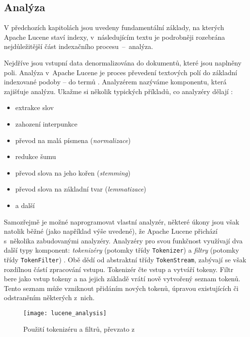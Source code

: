 \documentclass[11pt,oneside]{fithesis2}
\begin{document}
\subsection{Analýza}
V předchozích kapitolách jsou uvedeny fundamentální základy, na kterých Apache Lucene staví indexy, v~následujícím textu je podrobněji rozebrána nejdůležitější část indexačního procesu~--~analýza.

Nejdříve jsou vstupní data denormalizována do dokumentů, které jsou naplněny poli. Analýza v~Apache Lucene je proces převedení textových polí do základní indexované podoby -- do termů \cite[s.~28]{LuceneAction}. Analyzérem nazýváme komponentu, která zajišťuje analýzu. Ukažme si několik typických příkladů, co analyzéry dělají  \cite[s.~110]{LuceneAction}:

\begin{itemize}
	\item extrakce slov
	\item zahození interpunkce
	\item převod na malá písmena (\emph{normalizace})
	\item redukce šumu
	\item převod slova na jeho kořen (\emph{stemming})
	\item převod slova na základní tvar (\emph{lemmatizace})
	\item a další 
\end{itemize}

Samozřejmě je možné naprogramovat vlastní analyzér, některé úkony jsou však natolik běžné (jako například výše uvedené), že Apache Lucene přichází s~několika zabudovanými analyzéry. Analyzéry pro svou funkčnost využívají dva další typy komponent: \emph{tokenizéry} (potomky třídy \texttt{Tokenizer}) a \emph{filtry} (potomky třídy \texttt{TokenFilter})  \cite[s.~115]{LuceneAction}. Obě dědí od abstraktní třídy \texttt{TokenStream}, zabývají se však rozdílnou částí zpracování vstupu. Tokenizér čte vstup a vytváří tokeny. Filtr bere jako vstup tokeny a na jejich základě vrátí nově vytvořený seznam tokenů. Tento seznam může vzniknout přidáním nových tokenů, úpravou existujících či odstraněním některých z~nich. 

\begin{figure}[hb]
	\begin{center}
		\texttt{[image: lucene\_analysis]}
	\end{center}
	\caption{Použití tokenizéru a filtrů, převzato z~ \cite[s.~117]{LuceneAction}}	
	\label{AnalysisLucene}
\end{figure}
\end{document}

